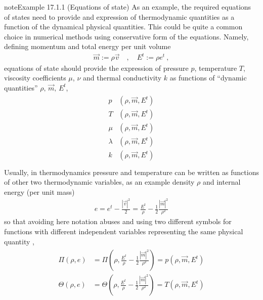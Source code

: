 \documentclass[letterpaper,10pt,english]{jupyterBook}
\begin{document}
\begin{sphinxadmonition}{note}{Example 17.1.1 (Equations of state)}
\sphinxAtStartPar
As an example, the required equations of states need to provide and expression of thermodynamic quantities as a function of the dynamical physical quantities. This could be quite a common choice in numerical methods using conservative form of the equations. Namely, defining momentum and total energy per unit volume
\begin{equation*}
\begin{split}\vec{m} := \rho \vec{v} \quad , \quad E^t := \rho e^t \ ,\end{split}
\end{equation*}
\sphinxAtStartPar
equations of state should provide the expression of pressure \(p\), temperature \(T\), viscosity coefficients \(\mu\), \(\nu\) and thermal conductivity \(k\) as functions of “dynamic quantities” \(\rho, \, \vec{m}, \, E^t\),
\begin{equation*}
\begin{split}\begin{aligned}
        p & (\rho, \vec{m}, E^t) \\
        T & (\rho, \vec{m}, E^t) \\
      \mu & (\rho, \vec{m}, E^t) \\
  \lambda & (\rho, \vec{m}, E^t) \\
        k & (\rho, \vec{m}, E^t) \\
\end{aligned}\end{split}
\end{equation*}
\sphinxAtStartPar
Usually, in thermodynamics pressure and temperature can be written as functions of other two thermodynamic variables, as an example density \(\rho\) and internal energy (per unit mass)
\begin{equation*}
\begin{split}e = e^t - \frac{|\vec{v}|^2}{2} = \frac{E^t}{\rho} - \frac{1}{2}\frac{|\vec{m}|^2}{\rho^2}\end{split}
\end{equation*}
\sphinxAtStartPar
so that \sphinxhyphen{} avoiding here notation abuses and using two different symbols for functions with different independent variables representing the same physical quantity \sphinxhyphen{},
\begin{equation*}
\begin{split}\begin{aligned}
  \Pi   \left( \rho, e \right) & = \Pi   \left( \rho, \frac{E^t}{\rho} - \frac{1}{2}\frac{|\vec{m}|^2}{\rho^2} \right) = p(\rho, \vec{m}, E^t) \\
  \Theta\left( \rho, e \right) & = \Theta\left( \rho, \frac{E^t}{\rho} - \frac{1}{2}\frac{|\vec{m}|^2}{\rho^2} \right) = T(\rho, \vec{m}, E^t) \\
\end{aligned}\end{split}
\end{equation*}\end{sphinxadmonition}
\end{document}
